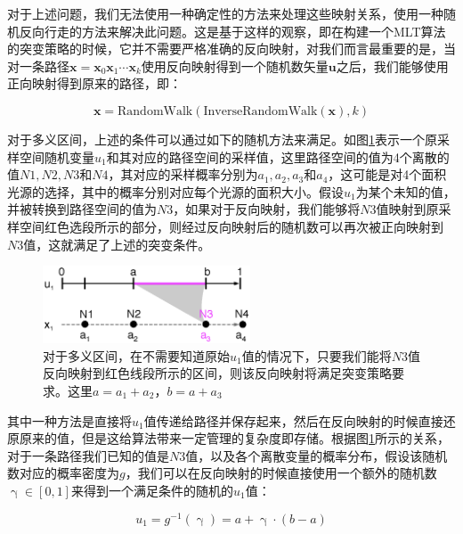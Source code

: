 对于上述问题，我们无法使用一种确定性的方法来处理这些映射关系，\cite{a:ReversibleJumpMetropolisLightTransportusingInverseMappings,a:ChartedMetropolisLightTransport}使用一种随机反向行走的方法来解决此问题。这是基于这样的观察，即在构建一个MLT算法的突变策略的时候，它并不需要严格准确的反向映射，对我们而言最重要的是，当对一条路径${\mathbf{x}}=\mathbf{x}_0\mathbf{x}_1\cdots\mathbf{x}_k$使用反向映射得到一个随机数矢量$\mathbf{u}$之后，我们能够使用正向映射得到原来的路径，即：

\begin{equation}
	{\mathbf{x}}=\text{RandomWalk}(\text{InverseRandomWalk}({\mathbf{x}}),k)
\end{equation}

对于多义区间，上述的条件可以通过如下的随机方法来满足。如图\ref{f:mlt-intervals}表示一个原采样空间随机变量$u_1$和其对应的路径空间的采样值，这里路径空间的值为4个离散的值$N1,N2,N3$和$N4$，其对应的采样概率分别为$a_1,a_2,a_3$和$a_4$，这可能是对4个面积光源的选择，其中的概率分别对应每个光源的面积大小。假设$u_1$为某个未知的值，并被转换到路径空间的值为$N3$，如果对于反向映射，我们能够将$N3$值映射到原采样空间红色选段所示的部分，则经过反向映射后的随机数可以再次被正向映射到$N3$值，这就满足了上述的突变条件。

\begin{figure}
	\sidecaption
	\includegraphics[width=0.55\textwidth]{figures/mlt/intervals}
	\caption{对于多义区间，在不需要知道原始$u_1$值的情况下，只要我们能将$N3$值反向映射到红色线段所示的区间，则该反向映射将满足突变策略要求。这里$a=a_1+a_2$，$b=a+a_3$}
	\label{f:mlt-intervals}
\end{figure}

其中一种方法是直接将$u_1$值传递给路径并保存起来，然后在反向映射的时候直接还原原来的值，但是这给算法带来一定管理的复杂度即存储。根据图\ref{f:mlt-intervals}所示的关系，对于一条路径我们已知的值是$N3$值，以及各个离散变量的概率分布，假设该随机数对应的概率密度为$g$，我们可以在反向映射的时候直接使用一个额外的随机数$\upgamma\in[0,1]$来得到一个满足条件的随机的$u_1$值：

\begin{equation}\label{e:mlt-intervals-1}
	u_1=g^{-1}(\upgamma)=a+\upgamma\cdot(b-a)
\end{equation}

